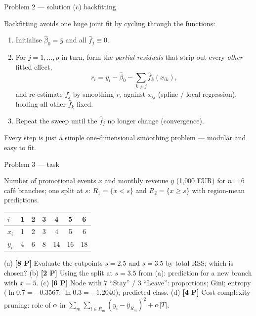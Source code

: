 \documentclass[aspectratio=169,11pt]{beamer}
\begin{document}
\begin{frame}{Problem 2 --- solution (c) backfitting}
  \begin{solutionbox}
    Backfitting avoids one huge joint fit by cycling through the functions:
    \begin{enumerate}
      \item Initialise $\hat\beta_0=\bar y$ and all $\hat f_j\equiv 0$.
      \item For $j=1,\dots,p$ in turn, form the \emph{partial residuals} that strip out every
        \emph{other} fitted effect,
        \[
          r_i=y_i-\hat\beta_0-\sum_{k\ne j}\hat f_k(x_{ik}),
        \]
        and re-estimate $f_j$ by smoothing $r_i$ against $x_{ij}$ (spline / local regression),
        holding all other $\hat f_k$ fixed.
      \item Repeat the sweep until the $\hat f_j$ no longer change (convergence).
    \end{enumerate}
    Every step is just a simple one-dimensional smoothing problem --- modular and easy to fit.
  \end{solutionbox}
\end{frame}

\begin{frame}{Problem 3 --- task}
  \begin{exercise}
    Number of promotional events $x$ and monthly revenue $y$ (1{,}000 EUR) for $n=6$ caf\'e
    branches; one split at $s$: $R_1=\{x<s\}$ and $R_2=\{x\ge s\}$ with region-mean predictions.
    \begin{center}\scriptsize
    \begin{tabular}{lcccccc}
      \toprule
      $i$ & 1 & 2 & 3 & 4 & 5 & 6\\
      \midrule
      $x_i$ & 1 & 2 & 3 & 4 & 5 & 6\\
      $y_i$ & 4 & 6 & 8 & 14 & 16 & 18\\
      \bottomrule
    \end{tabular}
    \end{center}
    (a) \textbf{[8 P]} Evaluate the cutpoints $s=2.5$ and $s=3.5$ by total RSS; which is chosen?
    (b) \textbf{[2 P]} Using the split at $s=3.5$ from (a): prediction for a new branch with $x=5$.
    (c) \textbf{[6 P]} Node with 7 ``Stay'' / 3 ``Leave'': proportions; Gini; entropy
        ($\ln 0.7=-0.3567$; $\ln 0.3=-1.2040$); predicted class.
    (d) \textbf{[4 P]} Cost-complexity pruning: role of $\alpha$ in
        $\sum_m\sum_{i\in R_m}(y_i-\hat y_{R_m})^2+\alpha|T|$.
  \end{exercise}
  \vspace{2pt}{\scriptsize\itshape Lecture slides: Chapter 8 --- Tree-Based Methods (Lecture 10).}
\end{frame}
\end{document}
